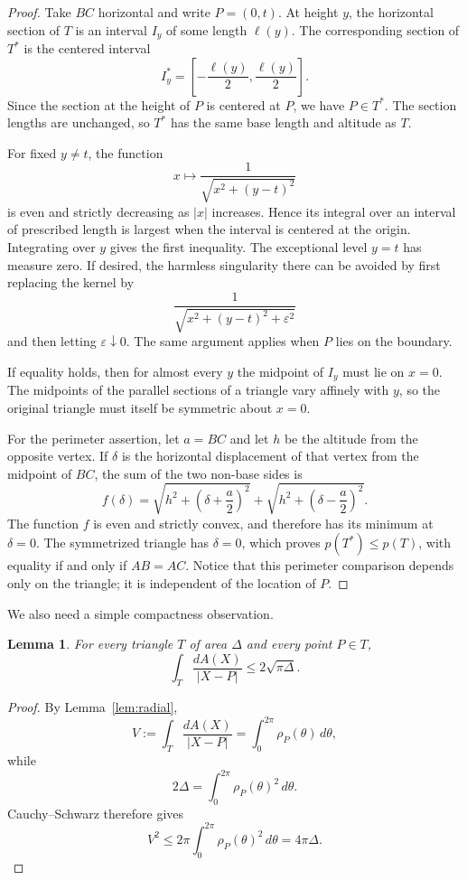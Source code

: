 \documentclass[11pt]{article}
\newtheorem{lemma}[theorem]{Lemma}
\theoremstyle{remark}
\newcommand{\area}{\Delta}
\begin{document}
\begin{proof}
Take $BC$ horizontal and write $P=(0,t)$.  At height $y$, the
horizontal section of $T$ is an interval $I_y$ of some length
$\ell(y)$.  The corresponding section of $T^*$ is the centered
interval
\[
 I_y^*=\left[-\frac{\ell(y)}2,\frac{\ell(y)}2\right].
\]
Since the section at the height of $P$ is centered at $P$, we have
$P\in T^*$.  The section lengths are unchanged, so $T^*$ has the same
base length and altitude as $T$.

For fixed $y\ne t$, the function
\[
 x\longmapsto\frac1{\sqrt{x^2+(y-t)^2}}
\]
is even and strictly decreasing as $|x|$ increases.  Hence its
integral over an interval of prescribed length is largest when the
interval is centered at the origin.  Integrating over $y$ gives the first inequality.  The exceptional
level $y=t$ has measure zero.  If desired, the harmless singularity
there can be avoided by first replacing the kernel by
\[
 \frac{1}{\sqrt{x^2+(y-t)^2+\varepsilon^2}}
\]
and then letting $\varepsilon\downarrow0$.  The same argument applies
when $P$ lies on the boundary.

If equality holds, then for almost every $y$ the midpoint of $I_y$
must lie on $x=0$.  The midpoints of the parallel sections of a
triangle vary affinely with $y$, so the original triangle must itself
be symmetric about $x=0$.

For the perimeter assertion, let $a=BC$ and let $h$ be the altitude
from the opposite vertex.  If $\delta$ is the horizontal displacement
of that vertex from the midpoint of $BC$, the sum of the two
non-base sides is
\[
 f(\delta)=
 \sqrt{h^2+\left(\delta+\frac a2\right)^2}
 +
 \sqrt{h^2+\left(\delta-\frac a2\right)^2}.
\]
The function $f$ is even and strictly convex, and therefore has its
minimum at $\delta=0$.  The symmetrized triangle has $\delta=0$,
which proves $p(T^*)\le p(T)$, with equality if and only if
$AB=AC$.  Notice that this perimeter comparison depends only on the
triangle; it is independent of the location of $P$.
\end{proof}

We also need a simple compactness observation.

\begin{lemma}\label{lem:area-bound}
For every triangle $T$ of area $\area$ and every point $P\in T$,
\[
 \int_T\frac{dA(X)}{|X-P|}
 \le 2\sqrt{\pi\area}.
\]
\end{lemma}

\begin{proof}
By Lemma~\ref{lem:radial},
\[
 V:=\int_T\frac{dA(X)}{|X-P|}
 =\int_0^{2\pi}\rho_P(\theta)\,d\theta,
\]
while
\[
 2\area=\int_0^{2\pi}\rho_P(\theta)^2\,d\theta.
\]
Cauchy--Schwarz therefore gives
\[
 V^2
 \le
 2\pi\int_0^{2\pi}\rho_P(\theta)^2\,d\theta
 =
 4\pi\area.
\]
\end{proof}
\end{document}
